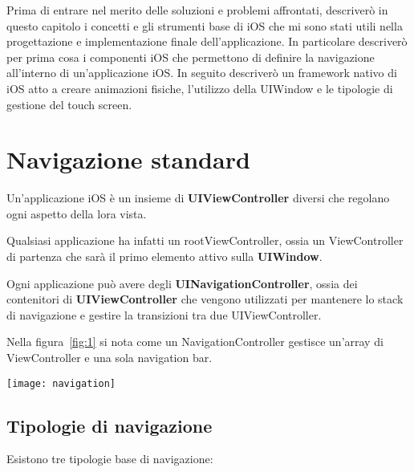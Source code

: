 

Prima di entrare nel merito delle soluzioni e problemi affrontati, descriverò in questo capitolo i concetti e
gli strumenti base di iOS che mi sono stati utili nella progettazione e implementazione finale dell'applicazione.
In particolare descriverò per prima cosa i componenti iOS che permettono di definire la navigazione
all'interno di un'applicazione iOS. In seguito descriverò un framework nativo di iOS atto a creare animazioni
fisiche, l'utilizzo della UIWindow e le tipologie di gestione del touch screen.

\section{Navigazione standard}

Un'applicazione iOS è un insieme di \textbf{UIViewController}\cite{viewcontroller} diversi che 
regolano ogni aspetto della lora vista.

Qualsiasi applicazione ha infatti un rootViewController, ossia un ViewController di partenza
che sarà il primo elemento attivo sulla \textbf{UIWindow}.

Ogni applicazione può avere degli \textbf{UINavigationController}\cite{navigationcontroller},
ossia dei contenitori di \textbf{UIViewController} che vengono
utilizzati per mantenere lo stack di navigazione e gestire la transizioni tra due UIViewController.

Nella figura~\ref{fig:1} si nota come un NavigationController gestisce un'array di ViewController e una sola 
navigation bar. \\

\begin{minipage}{\linewidth}
    \centering
    \texttt{[image: navigation]}
    \label{fig:1}
\end{minipage}

\subsection{Tipologie di navigazione}\label{sec:navigation}

Esistono tre tipologie base di navigazione:

